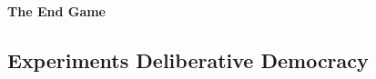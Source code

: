 \documentclass[11pt,a4paper,oneside,english]{article}
\begin{document}
\paragraph{The End Game}

\subsection[Deliberative Experiments]{Experiments Deliberative Democracy} \label{sec:deliberative-experiments}



\end{document}
